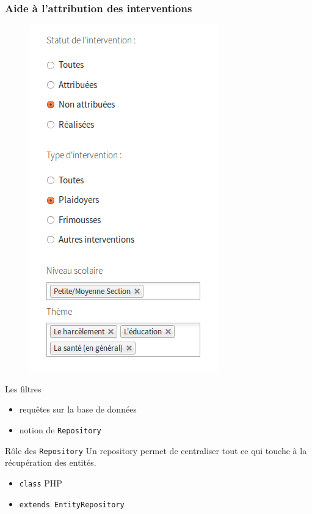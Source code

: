 \speaker{\Julie}

\begin{frame}
\frametitle{Aide à l'attribution des interventions}
	\begin{minipage}[c]{.40\linewidth}
      \begin{figure}[r]
		\includegraphics[scale=0.35]{images/filtreListeIntervention.png}
	  \end{figure}
   \end{minipage} \hfill
   \begin{minipage}[c]{.52\linewidth}
      \begin{block}{Les filtres}
		\begin{itemize}
			\item requêtes sur la base de données
			\item notion de \texttt{Repository}
		\end{itemize}
	  \end{block}
	  \begin{block}{Rôle des \texttt{Repository}}
		Un repository permet de centraliser tout ce qui touche à la récupération des entités.
		\begin{itemize}
		\item \texttt{class} PHP
		\item \texttt{extends EntityRepository}
		\end{itemize}
	  \end{block}
   \end{minipage} \hfill
\end{frame}
